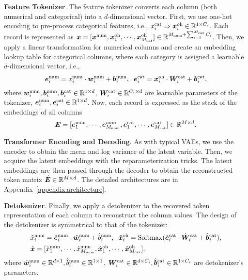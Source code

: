 \textbf{Feature Tokenizer}. The feature tokenizer converts each column (both numerical and categorical) into a $d$-dimensional vector.  First, we use one-hot encoding to pre-process categorical features, i.e., $ x_{i}^{{\rm cat}} \Rightarrow {\bm{x}}_{i}^{{\rm oh}} \in {\mathbb{R}}^{1 \times C_i} $. Each record is represented as ${\bm{x}} = [{\bm{x}}^{{\rm num}}, {\bm{x}}_{1}^{{\rm oh}}, \cdots, {\bm{x}}_{M_{{\rm cat}}}^{{\rm oh}}] \in {\mathbb{R}}^{M_{{\rm num}} + \sum_{i=1}^{M_{{\rm cat}}}C_i}$. Then, we apply a linear transformation for numerical columns and create an embedding lookup table for categorical columns, where each category is assigned a learnable $d$-dimensional vector, i.e., 
\begin{equation}\label{eqn:tokenizer}
\begin{split} 
    {\bm{e}}^{{\rm num}}_i  = x^{{\rm num}}_i\cdot {\bm{w}}^{{\rm num}}_i + {\bm{b}}_i^{{\rm num}}, \; \;  {\bm{e}}^{{\rm cat}}_i  =  {{\bm{x}}}^{{\rm oh}}_i \cdot {\bm{W}}^{{\rm cat}}_i + {\bm{b}}^{{\rm cat}}_i,
\end{split}
\end{equation}
where ${\bm{w}}^{{\rm num}}_i, {\bm{b}}^{{\rm num}}_i, {\bm{b}}^{{\rm cat}}_i \in {\mathbb{R}}^{1 \times d}$, ${\bm{W}}^{{\rm cat}}_i \in {\mathbb{R}}^{C_i \times d}$ are learnable parameters of the tokenizer, ${\bm{e}}^{{\rm num}}_i, {\bm{e}}^{{\rm cat}}_i\in {\mathbb{R}}^{1 \times d}$.
Now, each record is expressed as the stack of the embeddings of all columns
\begin{equation}
    {\bm{E}} = [{\bm{e}}^{{\rm num}}_{1}, \cdots, {\bm{e}}^{{\rm num}}_{M_{{\rm num}}}, {\bm{e}}^{{\rm cat}}_{1}, \cdots, {\bm{e}}^{{\rm cat}}_{M_{{\rm cat}}}] \in {\mathbb{R}}^{M \times d}.
\end{equation}

\textbf{Transformer Encoding and Decoding}. As with typical VAEs, we use the encoder to obtain the mean and log variance of the latent variable. Then, we acquire the latent embeddings with the reparameterization tricks. The latent embeddings are then passed through the decoder to obtain the reconstructed token matrix $\hat{{\bm{E}}} \in {\mathbb{R}}^{M\times d}$. The detailed architectures are in Appendix~\ref{appendix:architecture}.

\textbf{Detokenizer}. Finally, we apply a detokenizer to the recovered token representation of each column to reconstruct the column values. The design of the detokenizer is symmetrical to that of the tokenizer:
\begin{equation}\label{eqn:detokenizer}
\begin{split}
    & \hat{x}^{{\rm num}}_i = {{\hat{{\bm{e}}}}^{{\rm num}}_i} \cdot \hat{{\bm{w}}}_i^{{\rm num}} + \hat{b}^{{\rm num}}_i, \; \; \hat{{\bm{x}}}^{{\rm oh}}_i = {\rm Softmax} ({\hat{{\bm{e}}}^{{\rm cat}}_i} \cdot \hat{{\bm{W}}}_i^{{\rm cat}} + \hat{{\bm{b}}}^{{\rm cat}}_i ), \\
    & \hat{{\bm{x}}}   = [{\hat{x}}^{{\rm num}}_{1} , \cdots, {\hat{x}}^{{\rm num}}_{M_{{\rm num}}}, {\hat{{\bm{x}}}}^{{\rm oh}}_{1} , \cdots, {\hat{{\bm{x}}}}^{{\rm oh}}_{M_{{\rm cat}}}],
\end{split}
\end{equation}
where $\hat{{\bm{w}}}^{{\rm num}}_i \in {\mathbb{R}}^{d \times 1}, \hat{b}^{{\rm num}}_i \in {\mathbb{R}}^{1 \times 1}$, ${\bm{W}}^{{\rm cat}}_i \in {\mathbb{R}}^{d \times C_i}, \hat{{\bm{b}}}^{{\rm cat}}_i \in {\mathbb{R}}^{1 \times C_i}$ are detokenizer's parameters.

